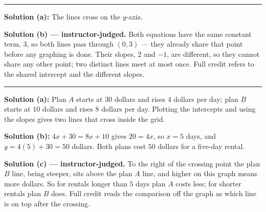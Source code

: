 \documentclass[12pt]{article}
\begin{document}
\vspace{0.15cm}\noindent\rule{\linewidth}{0.2pt}


\textbf{Solution (a):} \quad The lines cross on the $y$-axis. 

\noindent\textbf{Solution (b) --- instructor-judged.} Both equations have the same constant term,
$3$, so both lines pass through $(0, 3)$ --- they already share that point before any graphing is
done. Their slopes, $2$ and $-1$, are different, so they cannot share any other point; two distinct
lines meet at most once. Full credit refers to the shared intercept and the different slopes.

\vspace{0.15cm}\noindent\rule{\linewidth}{0.2pt}


\textbf{Solution (a):} \quad Plan $A$ starts at $30$ dollars and rises $4$ dollars per day; plan $B$
starts at $10$ dollars and rises $8$ dollars per day. Plotting the intercepts and using the slopes
gives two lines that cross inside the grid.

\noindent\textbf{Solution (b):} \quad $4x + 30 = 8x + 10$ gives $20 = 4x$, so $x = 5$ days, and
$y = 4(5) + 30 = 50$ dollars. Both plans cost $50$ dollars for a five-day rental. 

\noindent\textbf{Solution (c) --- instructor-judged.} To the right of the crossing point the plan
$B$ line, being steeper, sits above the plan $A$ line, and higher on this graph means more dollars.
So for rentals longer than $5$ days plan $A$ costs less; for shorter rentals plan $B$ does. Full
credit reads the comparison off the graph as which line is on top after the crossing.
\end{document}
